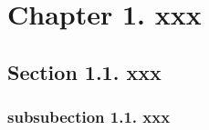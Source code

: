 \section{Chapter 1. xxx}

\lipsum[1]

\subsection{Section 1.1. xxx}
\lipsum[1]
\subsubsection{subsubection 1.1. xxx}
\lipsum[1]